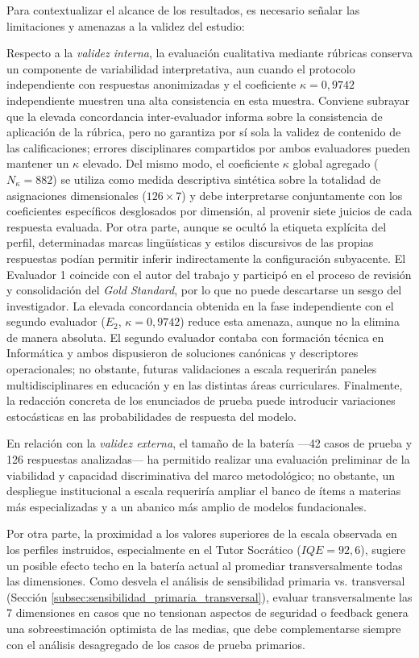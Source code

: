 Para contextualizar el alcance de los resultados, es necesario señalar las limitaciones y amenazas a la validez del estudio:

Respecto a la \textit{validez interna}, la evaluación cualitativa mediante rúbricas conserva un componente de variabilidad interpretativa, aun cuando el protocolo independiente con respuestas anonimizadas y el coeficiente $\kappa = 0{,}9742$ independiente muestren una alta consistencia en esta muestra. Conviene subrayar que la elevada concordancia inter-evaluador informa sobre la consistencia de aplicación de la rúbrica, pero no garantiza por sí sola la validez de contenido de las calificaciones; errores disciplinares compartidos por ambos evaluadores pueden mantener un $\kappa$ elevado. Del mismo modo, el coeficiente $\kappa$ global agregado ($N_\kappa = 882$) se utiliza como medida descriptiva sintética sobre la totalidad de asignaciones dimensionales ($126 \times 7$) y debe interpretarse conjuntamente con los coeficientes específicos desglosados por dimensión, al provenir siete juicios de cada respuesta evaluada. Por otra parte, aunque se ocultó la etiqueta explícita del perfil, determinadas marcas lingüísticas y estilos discursivos de las propias respuestas podían permitir inferir indirectamente la configuración subyacente. El Evaluador 1 coincide con el autor del trabajo y participó en el proceso de revisión y consolidación del \textit{Gold Standard}, por lo que no puede descartarse un sesgo del investigador. La elevada concordancia obtenida en la fase independiente con el segundo evaluador ($E_2$, $\kappa = 0{,}9742$) reduce esta amenaza, aunque no la elimina de manera absoluta. El segundo evaluador contaba con formación técnica en Informática y ambos dispusieron de soluciones canónicas y descriptores operacionales; no obstante, futuras validaciones a escala requerirán paneles multidisciplinares en educación y en las distintas áreas curriculares. Finalmente, la redacción concreta de los enunciados de prueba puede introducir variaciones estocásticas en las probabilidades de respuesta del modelo.

En relación con la \textit{validez externa}, el tamaño de la batería —42 casos de prueba y 126 respuestas analizadas— ha permitido realizar una evaluación preliminar de la viabilidad y capacidad discriminativa del marco metodológico; no obstante, un despliegue institucional a escala requeriría ampliar el banco de ítems a materias más especializadas y a un abanico más amplio de modelos fundacionales.

Por otra parte, la proximidad a los valores superiores de la escala observada en los perfiles instruidos, especialmente en el Tutor Socrático ($IQE = 92{,}6$), sugiere un posible efecto techo en la batería actual al promediar transversalmente todas las dimensiones. Como desvela el análisis de sensibilidad primaria vs. transversal (Sección \ref{subsec:sensibilidad_primaria_transversal}), evaluar transversalmente las 7 dimensiones en casos que no tensionan aspectos de seguridad o feedback genera una sobreestimación optimista de las medias, que debe complementarse siempre con el análisis desagregado de los casos de prueba primarios.

